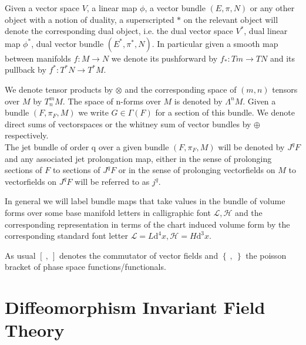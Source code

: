 \documentclass[a4paper,12pt, DIV=14, BCOR=5mm, twoside, headsepline]{scrbook}
\begin{document}
Given a vector space $V$, a linear map $\phi$, a vector bundle $(E,\pi,N)$ or any other object with a notion of duality, a superscripted $\ast$ on the relevant object will denote the corresponding dual object, i.e. the dual vector space $V^{\ast}$, dual linear map $\phi^{\ast}$, dual vector bundle $(E^{\ast}, \pi^{\ast},N)$. In particular given a smooth map between manifolds $f : M \rightarrow N$ we denote its pushforward by $f_{\ast} : Tm \rightarrow TN$ and its pullback by $f^{\ast} : T^{\ast}N \rightarrow T^{\ast}M$.

We denote tensor products by $\otimes$ and the corresponding space of $(m,n)$ tensors over $M$ by $T^m_nM$. The space of n-forms over $M$ is denoted by $\Lambda^nM$. Given a bundle $(F,\pi_{F},M)$ we write $G \in \Gamma(F) $ for a section of this bundle. We denote direct sums of vectorspaces or the whitney sum of vector bundles by $\oplus$ respectively. \\

The jet bundle of order q over a given bundle $(F,\pi_F,M)$ will be denoted by $J^qF$ and any associated jet prolongation map, either in the sense of prolonging sections of $F$ to sections of $J^qF$ or in the sense of prolonging vectorfields on $M$ to vectorfields on $J^qF$ will be referred to as $j^q$. 

In general we will label bundle maps that take values in the bundle of volume forms over some base manifold letters in calligraphic font $\mathcal{L}, \mathcal{H}$ and the corresponding representation in terms of the chart induced volume form by the corresponding standard font letter $\mathcal{L}=L \mathrm{d}^4x, \mathcal{H}= H \mathrm{d}^3x$.

As usual $\left[ \  ,   \  \right]$ denotes the commutator of vector fields and $\left \{  \  ,   \   \right \}$ the poisson bracket of phase space functions/functionals. 

\chapter{Diffeomorphism Invariant Field Theory}

\end{document}
